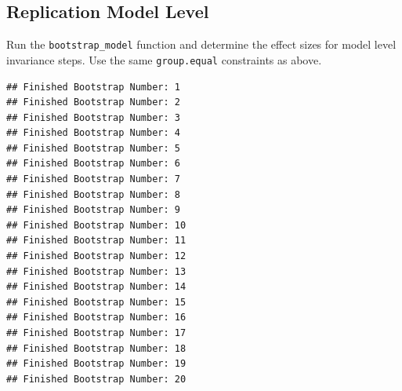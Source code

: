 \documentclass[
  english,
  man]{apa7}
\newenvironment{Shaded}{\begin{snugshade}}{\end{snugshade}}
\newcommand{\AttributeTok}[1]{\textcolor[rgb]{0.13,0.29,0.53}{#1}}
\newcommand{\CommentTok}[1]{\textcolor[rgb]{0.56,0.35,0.01}{\textit{#1}}}
\newcommand{\DecValTok}[1]{\textcolor[rgb]{0.00,0.00,0.81}{#1}}
\newcommand{\FunctionTok}[1]{\textcolor[rgb]{0.13,0.29,0.53}{\textbf{#1}}}
\newcommand{\NormalTok}[1]{#1}
\newcommand{\OtherTok}[1]{\textcolor[rgb]{0.56,0.35,0.01}{#1}}
\newcommand{\SpecialCharTok}[1]{\textcolor[rgb]{0.81,0.36,0.00}{\textbf{#1}}}
\newcommand{\StringTok}[1]{\textcolor[rgb]{0.31,0.60,0.02}{#1}}
\begin{document}
\subsection{Replication Model Level}\label{replication-model-level}

Run the \texttt{bootstrap\_model} function and determine the effect sizes for model level invariance steps. Use the same \texttt{group.equal} constraints as above.

\begin{Shaded}
\end{Shaded}

\begin{verbatim}
## Finished Bootstrap Number: 1
## Finished Bootstrap Number: 2
## Finished Bootstrap Number: 3
## Finished Bootstrap Number: 4
## Finished Bootstrap Number: 5
## Finished Bootstrap Number: 6
## Finished Bootstrap Number: 7
## Finished Bootstrap Number: 8
## Finished Bootstrap Number: 9
## Finished Bootstrap Number: 10
## Finished Bootstrap Number: 11
## Finished Bootstrap Number: 12
## Finished Bootstrap Number: 13
## Finished Bootstrap Number: 14
## Finished Bootstrap Number: 15
## Finished Bootstrap Number: 16
## Finished Bootstrap Number: 17
## Finished Bootstrap Number: 18
## Finished Bootstrap Number: 19
## Finished Bootstrap Number: 20
\end{verbatim}
\end{document}
